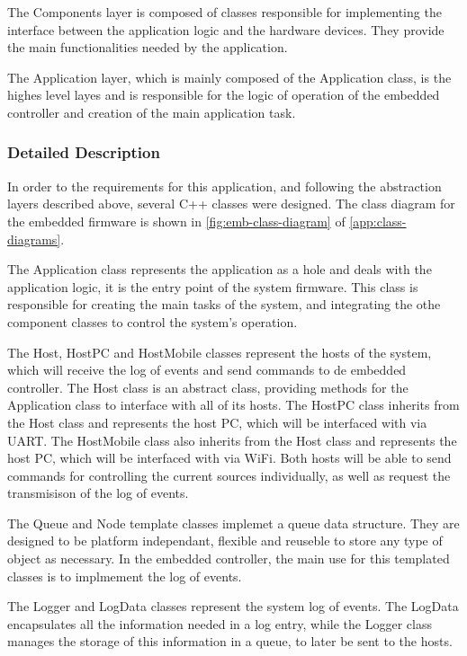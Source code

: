 \documentclass[10pt,twocolumn,letterpaper]{article}
\begin{document}
The Components layer is composed of classes responsible for implementing the interface between the application logic and the hardware devices.
They provide the main functionalities needed by the application.

The Application layer, which is mainly composed of the Application class, is the highes level layes and is responsible for the logic of operation of the embedded controller and creation of the main application task.

\subsubsection{Detailed Description}

In order to the requirements for this application, and following the abstraction layers described above, several C++ classes were designed.
The class diagram for the embedded firmware is shown in \autoref{fig:emb-class-diagram} of \autoref{app:class-diagrams}.

The Application class represents the application as a hole and deals with the application logic, it is the entry point of the system firmware.
This class is responsible for creating the main tasks of the system, and integrating the othe component classes to control the system's operation.

The Host, HostPC and HostMobile classes represent the hosts of the system, which will receive the log of events and send commands to de embedded controller.
The Host class is an abstract class, providing methods for the Application class to interface with all of its hosts.
The HostPC class inherits from the Host class and represents the host PC, which will be interfaced with via UART.
The HostMobile class also inherits from the Host class and represents the host PC, which will be interfaced with via WiFi.
Both hosts will be able to send commands for controlling the current sources individually, as well as request the transmisison of the log of events.

The Queue and Node template classes implemet a queue data structure.
They are designed to be platform independant, flexible and reuseble to store any type of object as necessary.
In the embedded controller, the main use for this templated classes is to implmement the log of events.

The Logger and LogData classes represent the system log of events.
The LogData encapsulates all the information needed in a log entry, while the Logger class manages the storage of this information in a queue, to later be sent to the hosts.
\end{document}
